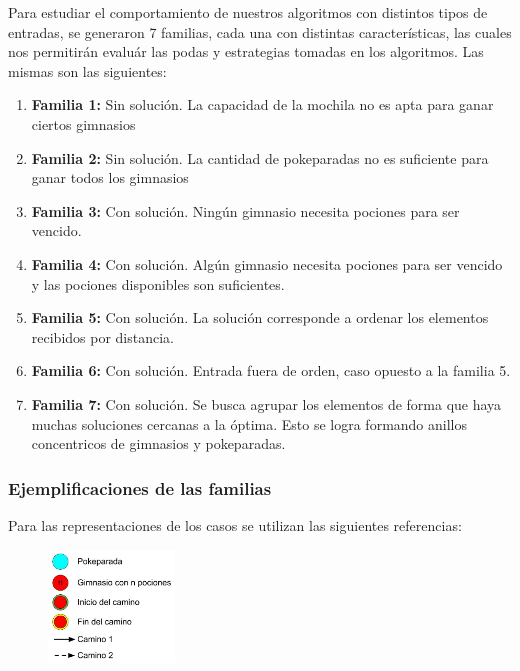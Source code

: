 \indent Para estudiar el comportamiento de nuestros algoritmos con distintos tipos de entradas, se generaron 7 familias, cada una con distintas caracter\'isticas, las cuales nos permitirán evaluár las  podas y estrategias tomadas en los algoritmos. Las mismas son las siguientes:

\begin{enumerate}
\item {\bf Familia 1:}  Sin solución. La capacidad de la mochila no es apta para ganar ciertos gimnasios
\item {\bf Familia 2:} Sin soluci\'on. La cantidad de pokeparadas no es suficiente para ganar todos los gimnasios
\item {\bf Familia 3:} Con solución. Ning\'un gimnasio necesita pociones para ser vencido.
\item {\bf Familia 4:} Con solución. Algún gimnasio necesita pociones para ser vencido y las pociones disponibles son suficientes.
\item {\bf Familia 5:} Con solución. La solución corresponde a ordenar los elementos recibidos por distancia.
\item {\bf Familia 6:} Con solución. Entrada fuera de orden, caso opuesto a la familia 5.
\item {\bf Familia 7:} Con solución. Se busca agrupar los elementos de forma que haya muchas soluciones cercanas a la óptima. Esto se logra formando anillos concentricos de gimnasios y pokeparadas.
\end{enumerate}


 \subsubsection*{Ejemplificaciones de las familias}
 
Para las representaciones de los casos se utilizan las siguientes referencias:
\begin{figure} [!ht]
\center
 \includegraphics[width=0.30\textwidth]{./EJ1/referencias.jpeg}
\end{figure}
 
